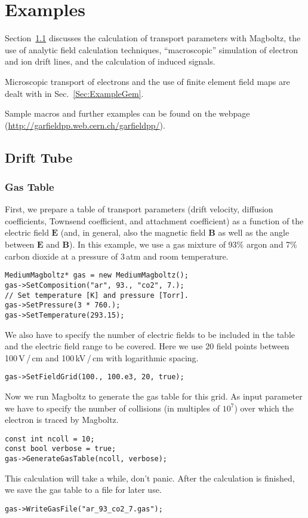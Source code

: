 \section{Examples}

Section~\ref{Sec:ExampleTube} discusses the 
calculation of transport parameters with Magboltz, 
the use of analytic field calculation techniques, 
``macroscopic'' simulation of electron and ion drift lines, 
and the calculation of induced signals. 
 
Microscopic transport of electrons and 
the use of finite element field maps are dealt with in 
Sec.~\ref{Sec:ExampleGem}. 

Sample macros and further examples can be found on the webpage 
(\url{http://garfieldpp.web.cern.ch/garfieldpp/}).
 
\subsection{Drift Tube}\label{Sec:ExampleTube}

\subsubsection{Gas Table}
First, we prepare a table of transport parameters 
(drift velocity, diffusion coefficients, Townsend coefficient,
and attachment coefficient) as a function 
of the electric field \(\mathbf{E}\)  
(and, in general, also the magnetic field \(\mathbf{B}\) 
as well as the angle between \(\mathbf{E}\) and \(\mathbf{B}\)).
In this example, we use a gas mixture of 93\% argon and 7\% 
carbon dioxide at a pressure of 3\,atm and room temperature.
\begin{lstlisting}
MediumMagboltz* gas = new MediumMagboltz();
gas->SetComposition("ar", 93., "co2", 7.);
// Set temperature [K] and pressure [Torr].
gas->SetPressure(3 * 760.);
gas->SetTemperature(293.15);
\end{lstlisting} 
We also have to specify the number of electric fields to be 
included in the table and the electric field range to be covered. 
Here we use 20 field points between 100\,V\,/\,cm and 100\,kV\,/\,cm 
with logarithmic spacing. 
\begin{lstlisting}
gas->SetFieldGrid(100., 100.e3, 20, true);
\end{lstlisting}
Now we run Magboltz to generate the gas table for this grid. 
As input parameter we have to specify the number of collisions 
(in multiples of \(10^{7}\)) over which the electron is traced 
by Magboltz.
\begin{lstlisting}
const int ncoll = 10;
const bool verbose = true;
gas->GenerateGasTable(ncoll, verbose);
\end{lstlisting}
This calculation will take a while, don't panic. 
After the calculation is finished, we save the gas table to a 
file for later use.
\begin{lstlisting}
gas->WriteGasFile("ar_93_co2_7.gas");
\end{lstlisting}

